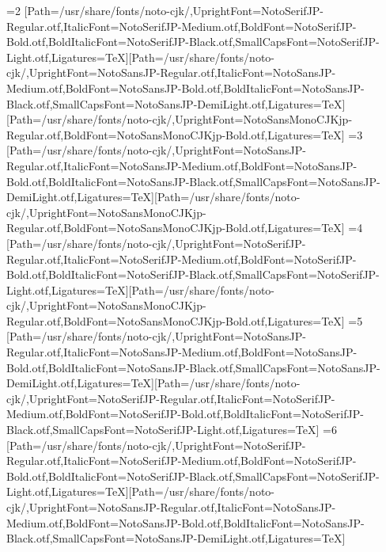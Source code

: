 \else\ifnum\value{CJKFonts}=2
[Path=/usr/share/fonts/noto-cjk/,UprightFont=NotoSerifJP-Regular.otf,ItalicFont=NotoSerifJP-Medium.otf,BoldFont=NotoSerifJP-Bold.otf,BoldItalicFont=NotoSerifJP-Black.otf,SmallCapsFont=NotoSerifJP-Light.otf,Ligatures=TeX][Path=/usr/share/fonts/noto-cjk/,UprightFont=NotoSansJP-Regular.otf,ItalicFont=NotoSansJP-Medium.otf,BoldFont=NotoSansJP-Bold.otf,BoldItalicFont=NotoSansJP-Black.otf,SmallCapsFont=NotoSansJP-DemiLight.otf,Ligatures=TeX][Path=/usr/share/fonts/noto-cjk/,UprightFont=NotoSansMonoCJKjp-Regular.otf,BoldFont=NotoSansMonoCJKjp-Bold.otf,Ligatures=TeX]
\else\ifnum\value{CJKFonts}=3
[Path=/usr/share/fonts/noto-cjk/,UprightFont=NotoSansJP-Regular.otf,ItalicFont=NotoSansJP-Medium.otf,BoldFont=NotoSansJP-Bold.otf,BoldItalicFont=NotoSansJP-Black.otf,SmallCapsFont=NotoSansJP-DemiLight.otf,Ligatures=TeX][Path=/usr/share/fonts/noto-cjk/,UprightFont=NotoSansMonoCJKjp-Regular.otf,BoldFont=NotoSansMonoCJKjp-Bold.otf,Ligatures=TeX]
\else\ifnum\value{CJKFonts}=4
[Path=/usr/share/fonts/noto-cjk/,UprightFont=NotoSerifJP-Regular.otf,ItalicFont=NotoSerifJP-Medium.otf,BoldFont=NotoSerifJP-Bold.otf,BoldItalicFont=NotoSerifJP-Black.otf,SmallCapsFont=NotoSerifJP-Light.otf,Ligatures=TeX][Path=/usr/share/fonts/noto-cjk/,UprightFont=NotoSansMonoCJKjp-Regular.otf,BoldFont=NotoSansMonoCJKjp-Bold.otf,Ligatures=TeX]
\else\ifnum\value{CJKFonts}=5
[Path=/usr/share/fonts/noto-cjk/,UprightFont=NotoSansJP-Regular.otf,ItalicFont=NotoSansJP-Medium.otf,BoldFont=NotoSansJP-Bold.otf,BoldItalicFont=NotoSansJP-Black.otf,SmallCapsFont=NotoSansJP-DemiLight.otf,Ligatures=TeX][Path=/usr/share/fonts/noto-cjk/,UprightFont=NotoSerifJP-Regular.otf,ItalicFont=NotoSerifJP-Medium.otf,BoldFont=NotoSerifJP-Bold.otf,BoldItalicFont=NotoSerifJP-Black.otf,SmallCapsFont=NotoSerifJP-Light.otf,Ligatures=TeX]
\else\ifnum\value{CJKFonts}=6
[Path=/usr/share/fonts/noto-cjk/,UprightFont=NotoSerifJP-Regular.otf,ItalicFont=NotoSerifJP-Medium.otf,BoldFont=NotoSerifJP-Bold.otf,BoldItalicFont=NotoSerifJP-Black.otf,SmallCapsFont=NotoSerifJP-Light.otf,Ligatures=TeX][Path=/usr/share/fonts/noto-cjk/,UprightFont=NotoSansJP-Regular.otf,ItalicFont=NotoSansJP-Medium.otf,BoldFont=NotoSansJP-Bold.otf,BoldItalicFont=NotoSansJP-Black.otf,SmallCapsFont=NotoSansJP-DemiLight.otf,Ligatures=TeX]
